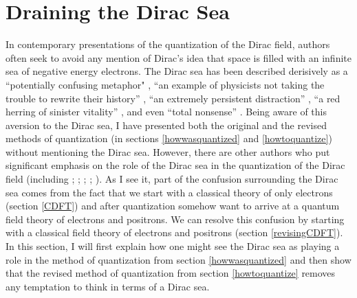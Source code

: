 \documentclass[12pt,secnumarabic,amsmath,amssymb,balancelastpage,nofootinbib]{article}
\begin{document}
\section{Draining the Dirac Sea}\label{diracsea}

In contemporary presentations of the quantization of the Dirac field, authors often seek to avoid any mention of Dirac's idea that space is filled with an infinite sea of negative energy electrons.  The Dirac sea has been described derisively as a ``potentially confusing metaphor" \citep[pg.\ 113]{zee2010}, ``an example of physicists not taking the trouble to rewrite their history'' \citep[pg.\ 120]{weinberg1985}, ``an extremely persistent distraction'' \citep[pg.\ 39]{duncan}, ``a red herring of sinister vitality'' \citep[pg.\ 34]{duncan}, and even ``total nonsense'' \citep[pg.\ 142]{schwartz}.  Being aware of this aversion to the Dirac sea, I have presented both the original and the revised methods of quantization (in sections \ref{howwasquantized} and \ref{howtoquantize}) without mentioning the Dirac sea.  However, there are other authors who put significant emphasis on the role of the Dirac sea in the quantization of the Dirac field (including \citealp[sec.\ 12]{heitler}; \citealp[sec.\ 8a]{schweberQFT}; \citealp[sec.\ 13.4]{bjorkendrellfields}; \citealp{hatfield}; \citealp[sec.\ 5.3]{greiner1996}).  As I see it, part of the confusion surrounding the Dirac sea comes from the fact that we start with a classical theory of only electrons (section \ref{CDFT}) and after quantization somehow want to arrive at a quantum field theory of electrons and positrons.  We can resolve this confusion by starting with a classical field theory of electrons and positrons (section \ref{revisingCDFT}).  In this section, I will first explain how one might see the Dirac sea as playing a role in the method of quantization from section \ref{howwasquantized} and then show that the revised method of quantization from section \ref{howtoquantize} removes any temptation to think in terms of a Dirac sea.
\end{document}
